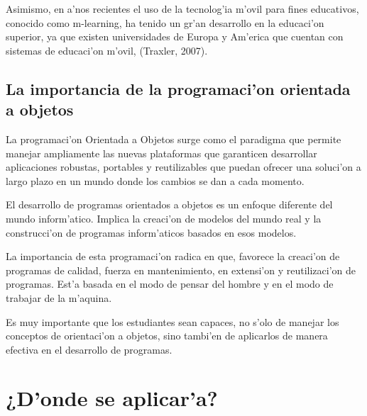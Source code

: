Asimismo, en a'nos recientes el uso de la tecnolog'ia m'ovil para fines educativos, conocido como m-learning, ha tenido un gr'an desarrollo en la educaci'on superior, ya que existen universidades de Europa y Am'erica que cuentan con sistemas de educaci'on m'ovil, (Traxler, 2007).

\subsection{La importancia de la programaci'on orientada a objetos}
La programaci'on Orientada a Objetos surge como el paradigma que permite manejar ampliamente las nuevas plataformas que garanticen desarrollar aplicaciones robustas, portables y reutilizables que puedan ofrecer una soluci'on a largo plazo en un mundo donde los cambios se dan a cada momento.

El desarrollo de programas orientados a objetos es un enfoque diferente del mundo inform'atico. Implica la creaci'on de modelos del mundo real y la construcci'on de programas inform'aticos basados en esos modelos.

La importancia de esta programaci'on radica en que, favorece la creaci'on de programas de calidad, fuerza en mantenimiento, en extensi'on y reutilizaci'on de programas. Est'a basada en el modo de pensar del hombre y en el modo de trabajar de la m'aquina.

Es muy importante que los estudiantes sean capaces, no s'olo de manejar los conceptos de orientaci'on a objetos, sino tambi'en de aplicarlos de manera efectiva en el desarrollo de programas.

\section{¿D'onde se aplicar'a?}
